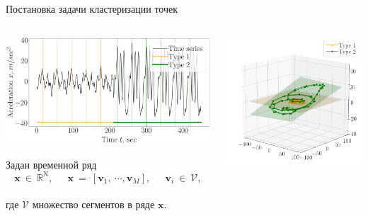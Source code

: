 \documentclass[10pt,pdf,hyperref={unicode}]{beamer}
\begin{document}
\begin{frame}[shrink=5]{Постановка задачи кластеризации точек}

\begin{center}
	\begin{columns}
   		 \begin{column}{0.7\textwidth}
        			\includegraphics[width=1\textwidth]{results/example_slides}
			
			 Задан временной ряд $$\textbf{x}~\in~\mathbb{R}^{\text{N}},~\quad~\textbf{x}~=~[\textbf{v}_1,~\cdots, \textbf{v}_M],~\quad~\textbf{v}_i~\in~\mathcal{V},$$\\ где $\mathcal{V}$ множество сегментов в ряде $\textbf{x}$.
   		 \end{column}
   		 \begin{column}{0.55\textwidth}
        			\includegraphics[width=1\textwidth]{results/example_phase}
			

\end{column}
\end{columns}
\end{center}
\end{frame}
\end{document}
